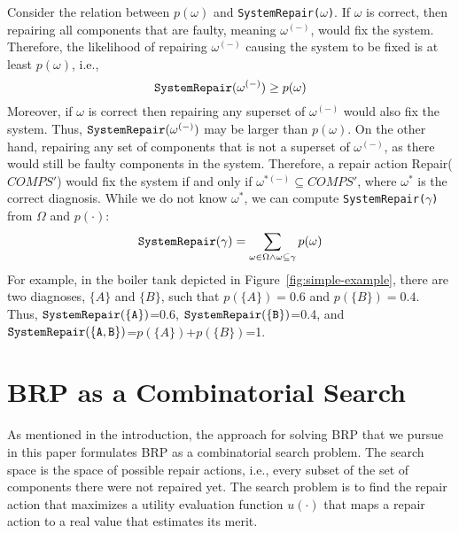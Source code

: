 \documentclass[letterpaper]{article}
\newcommand\meir[1]{\textcolor{red}{meir: #1}}
\newcommand\sysrep[1]{{\tt SystemRepair(#1)}}
\newcommand{\COMPS}{\textit{COMPS}}
\begin{document}
Consider the relation between $p(\omega)$ and \sysrep{$\omega$}. If $\omega$ is correct, then repairing all components that are faulty, meaning $\omega^{(-)}$, would fix the system. Therefore, the likelihood of repairing $\omega^{(-)}$ causing the system to be fixed is at least $p(\omega)$, i.e.,
\[ \sysrep{\omega^{(-)}}\geq p(\omega)  \]
Moreover, if $\omega$ is correct then repairing any superset of $\omega^{(-)}$ would also fix the system. Thus, $\sysrep{\omega^{(-)}}$ may be larger than $p(\omega)$.
On the other hand, repairing any set of components that is not a superset of $\omega^{(-)}$, as there would still be faulty components in the system.
Therefore, a repair action Repair($\COMPS '$) would fix the system if and only if $\omega^{*{(-)}}\subseteq \COMPS '$, where $\omega^*$ is the correct diagnosis.
While we do not know $\omega^*$, we can compute \sysrep{$\gamma$} from $\Omega$ and $p(\cdot)$:
\[ \sysrep{\gamma} = \sum_{\omega\in \Omega \wedge \omega\subseteq \gamma} p(\omega) \]
For example, in the boiler tank depicted in Figure~\ref{fig:simple-example}, there are two diagnoses, $\{A\}$ and $\{B\}$, such that $p(\{A\})=0.6$ and $p(\{B\})=0.4$. Thus, $\sysrep{\{A\}}$=0.6, $\sysrep{\{B\}}$=0.4, and $\sysrep{\{A,B\}}$=$p(\{A\})$+$p(\{B\})$=1.


%
%
%
%



\section{BRP as a Combinatorial Search}
As mentioned in the introduction, the approach for solving BRP that we pursue in this paper formulates BRP as a combinatorial search problem. The search space is the space of possible repair actions, i.e., every subset of the set of components there were not repaired yet.
The search problem is to find the repair action that maximizes a utility evaluation function $u(\cdot)$ that maps a repair action to a real value that estimates its merit.
\end{document}
